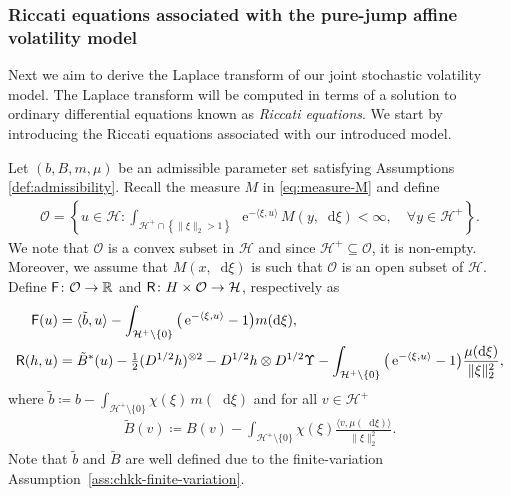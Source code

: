 \documentclass[10pt,a4paper,reqno]{amsart}
\newcommand*\D{\mathop{}\!\mathrm{d}}
\newcommand*\E{\mathop{}\!\mathrm{e}}
\numberwithin{equation}{section}
\theoremstyle{plain}
\theoremstyle{definition}
\theoremstyle{example}
\renewcommand{\MR}{\mathbb{R}}
\newcommand{\MC}{\mathbb{C}}
\newcommand{\cH}{\mathcal{H}}
\newcommand{\cO}{\mathcal{O}}
\newcommand{\df}{\coloneqq}
\newcommand{\set}[1]{\left\{ #1\right\}}
\newcommand{\norm}[1]{\|#1\|}
\newcommand{\cHplus}{\cH^{+}}
\newcommand{\cHpluso}{\cHplus\setminus \{0\}}
\begin{document}
\subsubsection{Riccati equations associated with the pure-jump affine volatility model} \label{sec:Riccati-jumps}

Next we aim to derive the Laplace transform of our joint stochastic volatility model. The
Laplace transform will be computed in terms of a solution to ordinary differential equations
known as \emph{Riccati equations}. We start by introducing the Riccati equations associated with our introduced model.


Let $(b,B,m,\mu)$ be an admissible parameter set satisfying Assumptions \ref{def:admissibility}. Recall the measure $M$ in \eqref{eq:measure-M} and define 
\begin{align*}
  \cO=\set{u\in\cH\colon \int_{\cHplus\cap\set{\norm{\xi}_2>1}}\E^{-\langle
  \xi,u\rangle}\,M(y,\D\xi)<\infty,\quad  \forall y\in\cHplus}.
\end{align*}
We note that $\cO$ is a convex subset in $\cH$ and since
$\cHplus\subseteq \cO$, it is non-empty. Moreover, we assume that $M(x,\D\xi)$
is such that $\cO$ is an open subset of $\cH$.
Define ${\sf F}\colon \cO \to \MR$ and ${\sf R}\colon H \times \cO \to \cH$, respectively as
\begin{align}
 {\sf F}(u)&=\langle \tilde{b}, u\rangle - \int_{\cHpluso}\big(\E^{-\langle \xi, u\rangle}-1\big) m(\D \xi), \label{eq:F}\\
 {\sf R}(h,u)&= \tilde{B}^{*}(u)-\tfrac{1}{2}(D^{1/2}h)^{\otimes 2}
     -D^{1/2} h \otimes D^{1/2}\Upsilon 
    - \int_{\cHpluso}\big(\E^{-\langle
    \xi,u\rangle}-1\big)\frac{\mu(\D \xi)}{\norm{\xi}_2^{2}}, \label{eq:R}
\end{align}
where $\tilde{b}\df b-\int_{\cHpluso}\chi(\xi)\,m(\D\xi)$ and for all $v\in\cHplus$
\begin{align*}
  \tilde{B}(v)\df B(v)-\int_{\cHpluso}\chi(\xi)\frac{\langle
  v,\mu(\D\xi)\rangle}{\norm{\xi}_2^{2}}.    
\end{align*}
Note that $\tilde{b}$ and $\tilde{B}$ are well defined due to the
finite-variation Assumption~\ref{ass:chkk-finite-variation}.
\end{document}
